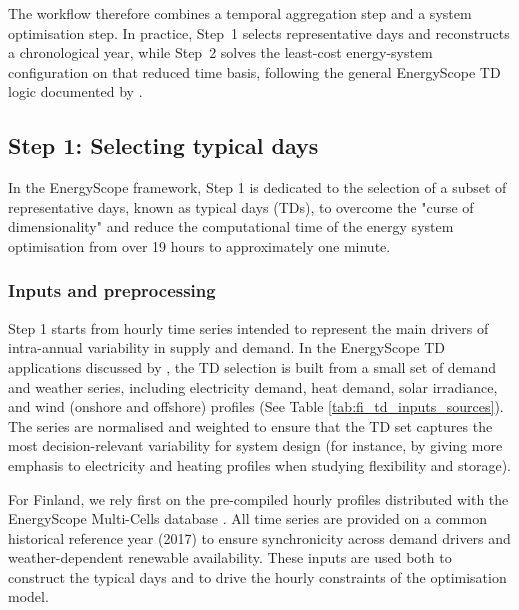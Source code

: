 \documentclass{article}
\begin{document}
The workflow therefore combines a temporal aggregation step and a system optimisation step. In practice, Step~1 selects representative days and reconstructs a chronological year, while Step~2 solves the least-cost energy-system configuration on that reduced time basis, following the general EnergyScope TD logic documented by \citet{limpensEnergyScopeTDNovel2019}.

\subsection{Step 1: Selecting typical days}
In the EnergyScope framework, Step 1 is dedicated to the selection of a subset of representative days, known as typical days (TDs), to overcome the "curse of dimensionality" and reduce the computational time of the energy system optimisation from over 19 hours to approximately one minute.

\subsubsection{Inputs and preprocessing}
Step 1 starts from hourly time series intended to represent the main drivers of intra-annual variability in supply and demand. In the EnergyScope TD applications discussed by \citet{limpensGeneratingEnergyTransition2021}, the TD selection is built from a small set of demand and weather series, including electricity demand, heat demand, solar irradiance, and wind (onshore and offshore) profiles (See Table \ref{tab:fi_td_inputs_sources}). The series are normalised and weighted to ensure that the TD set captures the most decision-relevant variability for system design (for instance, by giving more emphasis to electricity and heating profiles when studying flexibility and storage).

For Finland, we rely first on the pre-compiled hourly profiles distributed with the EnergyScope Multi-Cells database \cite{thiranExploringOptionsFossilfree2025}. All time series are provided on a common historical reference year (2017) to ensure synchronicity across demand drivers and weather-dependent renewable availability. These inputs are used both to construct the typical days and to drive the hourly constraints of the optimisation model.
\end{document}
